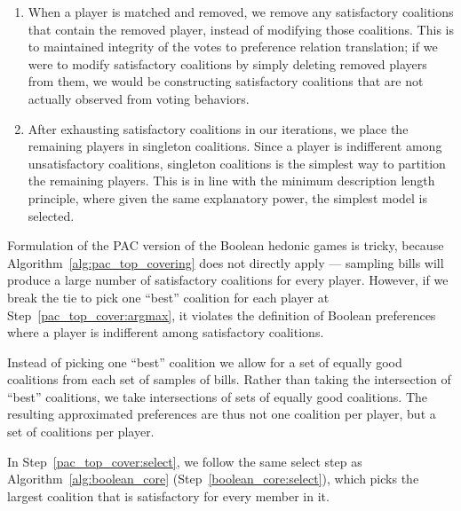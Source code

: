 \begin{enumerate}
  \item When a player is matched and removed, we remove any satisfactory coalitions that
    contain the removed player, instead of modifying those coalitions.
    This is to maintained integrity of the votes to preference relation
    translation; if we were to modify satisfactory coalitions by simply
    deleting removed players from them, we would be constructing satisfactory
    coalitions that are not actually observed from voting behaviors.
  \item After exhausting satisfactory coalitions in our iterations, we place
    the remaining players in singleton coalitions.
    Since a player is indifferent among unsatisfactory coalitions, singleton
    coalitions is the simplest way to partition the remaining players.
    This is in line with the minimum description length principle, where given
    the same explanatory power, the simplest model is selected.
\end{enumerate}

Formulation of the PAC version of the Boolean hedonic games is tricky, because
Algorithm~\ref{alg:pac_top_covering} does not directly apply --- sampling bills
will produce a large number of satisfactory coalitions for every player. However, if we break the tie to pick one ``best'' coalition for each player at
Step~\ref{pac_top_cover:argmax}, it violates the definition of Boolean
preferences where a player is indifferent among satisfactory coalitions.

Instead of picking one ``best'' coalition we allow for a set of equally good
coalitions from each set of samples of bills.
Rather than taking the intersection of ``best'' coalitions, we take intersections
of sets of equally good coalitions.
The resulting approximated preferences are thus not one coalition per player,
but a set of coalitions per player.

In Step~\ref{pac_top_cover:select}, we follow the same select step as
Algorithm~\ref{alg:boolean_core} (Step~\ref{boolean_core:select}), which picks
the largest coalition that is satisfactory for every member in it.

